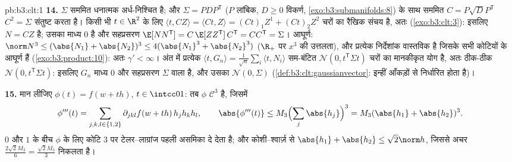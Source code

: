\begin{solution}{pb:b3:clt:1}
\textbf{14.} $\Sigma$ सममित धनात्मक अर्ध-निश्चित है; और
$\Sigma = PDP^{\mathsf T}$ ($P$ लांबिक, $D \geq 0$ विकर्ण,
\cref{exo:b3:submanifolds:8}) के साथ सममित $C =
P\sqrt DP^{\mathsf T}$ $C^2 = \Sigma$ संतुष्ट करता है। किसी
भी $t \in \R^2$ के लिए $\langle t, CZ\rangle = \langle Ct,
Z\rangle = (Ct)_1Z^1 + (Ct)_2Z^2$   चरों का
रैखिक संचय है, अतः 
(\cref{exo:b3:clt:3}): इसलिए $N = CZ$  है; उसका
माध्य $0$ है और सहप्रसरण $\E[NN^{\mathsf T}] =
C\,\E[ZZ^{\mathsf T}]\,C^{\mathsf T} = CC^{\mathsf T} =
\Sigma$। आघूर्ण: $\norm N^3 \leq (\abs{N_1} +
\abs{N_2})^3 \leq 4(\abs{N_1}^3 + \abs{N_2}^3)$ ($\R_+$ पर
$x^3$ की उत्तलता), और प्रत्येक निर्देशांक वास्तविक  है
जिसके सभी कोटियों के आघूर्ण हैं
(\cref{exo:b3:product:10}): अतः $\gamma' < \infty$। अंत में
प्रत्येक $\langle t, G_n\rangle = \frac1{\sqrt
n}\sum_i\langle t, N_i\rangle$  सम-बंटित
$\mathcal N(0, t^{\mathsf T}\Sigma t)$ चरों का मानकीकृत योग
है, अतः ठीक-ठीक $\mathcal N(0, t^{\mathsf T}\Sigma t)$:
इसलिए $G_n$ माध्य $0$ और सहप्रसरण $\Sigma$ वाला 
है, और उसका  $\mathcal N(0, \Sigma)$
(\cref{def:b3:clt:gaussianvector}:  इन्हीं आँकड़ों
से निर्धारित होता है)।

\textbf{15.} मान लीजिए $\phi(t) = f(w + th)$, $t \in
\intcc01$: तब $\phi$ $\mathcal C^3$ है, जिसमें
\[
\phi'''(t) = \sum_{j,k,l\in\{1,2\}}\partial_{jkl}f(w +
th)\,h_jh_kh_l, \qquad \abs{\phi'''(t)} \leq
M_3\Bigl(\sum_j\abs{h_j}\Bigr)^3 = M_3(\abs{h_1} +
\abs{h_2})^3 .
\]
$0$ और $1$ के बीच $\phi$ के लिए कोटि $3$ पर
टेलर--लाग्रांज पहली असमिका दे देता है; और कोशी--श्वार्ज़ से
$\abs{h_1} + \abs{h_2} \leq \sqrt2\norm h$, जिससे अचर
$\frac{2\sqrt2M_3}6 = \frac{\sqrt2M_3}3$ निकलता है।


\end{solution}
